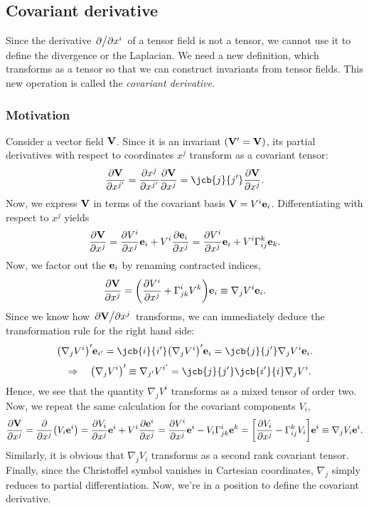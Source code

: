 \documentclass{article}
\begin{document}
\subsection{Covariant derivative}
Since the derivative $ \pdv*{}{x^{i}} $ of a tensor field is not a tensor, we cannot use it to define the divergence or the Laplacian. We need a new definition, which transforms as a tensor so that we can construct invariants from tensor fields. This new operation is called the \textit{covariant derivative.} 
\subsubsection{Motivation}
Consider a vector field $ \vb{V} $. Since it is an invariant $ (\vb{V}^\prime = \vb{V}) $, its partial derivatives with respect to coordinates $ x^{j} $ transform as a covariant tensor:
\[
\pdv{\vb{V}}{x^{j^\prime}} = \pdv{x^{j}}{x^{j^\prime}} \pdv{\vb{V}}{x^{j}} = \jcb{j}{j^\prime} \pdv{\vb{V}}{x^{j}}.
\]
Now, we express $ \vb{V} $ in terms of the covariant basis $ \vb{V} = V^{i} \vb{e}_{i} $. Differentiating with respect to $ x^{j} $ yields
\[
\pdv{\vb{V}}{x^{j}} 
= \pdv{V^{i}}{x^{j}} \vb{e}_{i} + V^{i} \pdv{\vb{e}_{i}}{x^{j}}
= \pdv{V^{i}}{x^{j}} \vb{e}_{i}  + V^{i} \Gamma^{k}_{ij} \vb{e}_{k}.
\]
Now, we factor out the $ \vb{e}_{i} $ by renaming contracted indices,
\[
\pdv{\vb{V}}{x^{j}} = \qty( \pdv{V^{i}}{x^{j}} + \Gamma^{i}_{jk} V^{k} )\vb{e}_{i} \equiv \nabla_{j} V^{i} \vb{e}_{i}.
\]
Since we know how $ \pdv*{\vb{V}}{x^{j}} $ transforms, we can immediately deduce the transformation rule for the right hand side:
\[
\qty(\nabla_{j} V^{i})^\prime \vb{e}_{i^\prime} = \jcb{i}{i^\prime} \qty(\nabla_{j} V^{i})^\prime \vb{e}_{i} = \jcb{j}{j^\prime} \nabla_{j} V^{i} \vb{e}_{i}.
\]\[
\implies \qty(\nabla_{j} V^{i})^\prime \equiv \nabla_{j^\prime} V^{i^\prime} = \jcb{j}{j^\prime} \jcb{i^\prime}{i} \nabla_{j} V^{i}.
\]
Hence, we see that the quantity $ \nabla_{j} V^{i} $ transforms as a mixed tensor of order two. Now, we repeat the same calculation for the covariant components $ V_{i} $,
\[
\pdv{\vb{V}}{x^{j}} = \pdv{}{x^{j}}\qty(V_{i} \vb{e}^{i}) = \pdv{V_{i}}{x^{j}} \vb{e}^{i} + V^{i} \pdv{\vb{e}^{i}}{x^{j}} = \pdv{V^{i}}{x^{j}} \vb{e}^{i} - V_{i} \Gamma ^{i}_{jk} \vb{e}^{k} = \qty[\pdv{V_{i}}{x^{j}} - \Gamma^{k}_{ij} V_{i}] \vb{e}^{i} \equiv \nabla_{j} V_{i} \vb{e}^{i}.
\]
Similarly, it is obvious that $ \nabla_{j} V_{i} $ transforms as a second rank covariant tensor. Finally, since the Christoffel symbol vanishes in Cartesian coordinates, $ \nabla_{j} $ simply reduces to partial differentiation. Now, we're in a position to define the covariant derivative.
\end{document}
